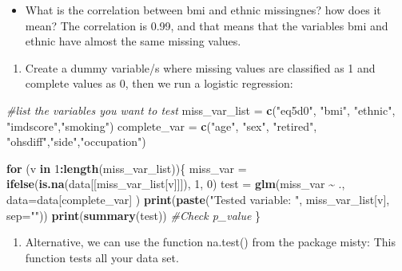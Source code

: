 \documentclass[
]{article}
\newenvironment{Shaded}{\begin{snugshade}}{\end{snugshade}}
\newcommand{\AttributeTok}[1]{\textcolor[rgb]{0.13,0.29,0.53}{#1}}
\newcommand{\CommentTok}[1]{\textcolor[rgb]{0.56,0.35,0.01}{\textit{#1}}}
\newcommand{\ControlFlowTok}[1]{\textcolor[rgb]{0.13,0.29,0.53}{\textbf{#1}}}
\newcommand{\DecValTok}[1]{\textcolor[rgb]{0.00,0.00,0.81}{#1}}
\newcommand{\FunctionTok}[1]{\textcolor[rgb]{0.13,0.29,0.53}{\textbf{#1}}}
\newcommand{\NormalTok}[1]{#1}
\newcommand{\OtherTok}[1]{\textcolor[rgb]{0.56,0.35,0.01}{#1}}
\newcommand{\SpecialCharTok}[1]{\textcolor[rgb]{0.81,0.36,0.00}{\textbf{#1}}}
\newcommand{\StringTok}[1]{\textcolor[rgb]{0.31,0.60,0.02}{#1}}
\providecommand{\tightlist}{%
  \setlength{\itemsep}{0pt}\setlength{\parskip}{0pt}}
\begin{document}
\begin{itemize}
\tightlist
\item
  What is the correlation between bmi and ethnic missingnes? how does it
  mean? The correlation is 0.99, and that means that the variables bmi
  and ethnic have almost the same missing values.
\end{itemize}

\begin{enumerate}
\def\labelenumi{\arabic{enumi}.}
\setcounter{enumi}{1}
\tightlist
\item
  Create a dummy variable/s where missing values are classified as 1 and
  complete values as 0, then we run a logistic regression:
\end{enumerate}

\begin{Shaded}
\begin{Highlighting}[]
\CommentTok{\#list the variables you want to test}
\NormalTok{miss\_var\_list }\OtherTok{=} \FunctionTok{c}\NormalTok{(}\StringTok{"eq5d0"}\NormalTok{, }\StringTok{"bmi"}\NormalTok{, }\StringTok{"ethnic"}\NormalTok{, }\StringTok{"imdscore"}\NormalTok{,}\StringTok{"smoking"}\NormalTok{)}
\NormalTok{complete\_var  }\OtherTok{=} \FunctionTok{c}\NormalTok{(}\StringTok{"age"}\NormalTok{, }\StringTok{"sex"}\NormalTok{, }\StringTok{"retired"}\NormalTok{, }\StringTok{"ohsdiff"}\NormalTok{,}\StringTok{"side"}\NormalTok{,}\StringTok{"occupation"}\NormalTok{)}

\ControlFlowTok{for}\NormalTok{ (v }\ControlFlowTok{in} \DecValTok{1}\SpecialCharTok{:}\FunctionTok{length}\NormalTok{(miss\_var\_list))\{}
\NormalTok{ miss\_var }\OtherTok{=} \FunctionTok{ifelse}\NormalTok{(}\FunctionTok{is.na}\NormalTok{(data[[miss\_var\_list[v]]]), }\DecValTok{1}\NormalTok{, }\DecValTok{0}\NormalTok{)}
\NormalTok{ test }\OtherTok{=} \FunctionTok{glm}\NormalTok{(miss\_var }\SpecialCharTok{\textasciitilde{}}\NormalTok{ ., }\AttributeTok{data=}\NormalTok{data[complete\_var] )}
 \FunctionTok{print}\NormalTok{(}\FunctionTok{paste}\NormalTok{(}\StringTok{"Tested variable: "}\NormalTok{, miss\_var\_list[v], }\AttributeTok{sep=}\StringTok{""}\NormalTok{)) }
 \FunctionTok{print}\NormalTok{(}\FunctionTok{summary}\NormalTok{(test))   }\CommentTok{\#Check p\_value}
\NormalTok{\}}
\end{Highlighting}
\end{Shaded}

\begin{enumerate}
\def\labelenumi{\arabic{enumi}.}
\setcounter{enumi}{2}
\tightlist
\item
  Alternative, we can use the function na.test() from the package misty:
  This function tests all your data set.
\end{enumerate}
\end{document}
